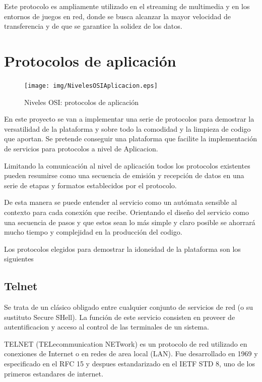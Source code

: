 \documentclass[a4paper,spanish,12pt]{book}
\begin{document}
Este protocolo es ampliamente utilizado en el streaming de multimedia y en los entornos de juegos en red, donde se busca alcanzar la mayor velocidad de transferencia y de que se garantice la solidez de los datos.

\section{Protocolos de aplicación}

\begin{figure}
	\texttt{[image: img/NivelesOSIAplicacion.eps]}	
              \caption{Niveles OSI: protocolos de aplicación}
  \label{fig:nivelesOSIAplicacion}
\end{figure}

En este proyecto se van a implementar una serie de protocolos para demostrar la versatilidad de la plataforma y sobre todo la comodidad y la limpieza de codigo que aportan. Se pretende conseguir una plataforma que facilite la implementación de servicios para protocolos a nivel de Aplicacion.

Limitando la comunicación al nivel de aplicación todos los protocolos existentes pueden resumirse como una secuencia de emisión y recepción de datos en una serie de etapas y formatos establecidos por el protocolo. 

De esta manera se puede entender al servicio como un autómata sensible al contexto para cada conexión que recibe. Orientando el diseño del servicio como una secuencia de pasos y que estos sean lo más simple y claro posible se ahorrará mucho tiempo y complejidad en la producción del codigo. 

Los protocolos elegidos para demostrar la idoneidad de la plataforma son los siguientes


\subsection{Telnet}
Se trata de un cl\'asico obligado entre cualquier conjunto de servicios de red (o su sustituto Secure SHell). La función de este servicio consisten en proveer de autentificacion y acceso al control de las terminales de un sistema.

TELNET (TELecommunication NETwork) es un protocolo de red utilizado en conexiones de Internet o en redes de area local (LAN). Fue desarrollado en 1969 y especificado en el RFC 15 y despues estandarizado en el IETF STD 8, uno de los primeros estandares de internet.
\end{document}

